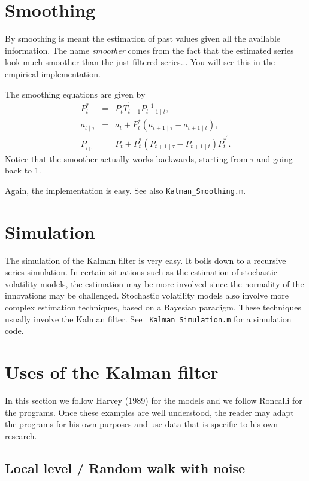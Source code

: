 \documentclass[12pt,a4paper]{article}
\begin{document}
\section{Smoothing}

By smoothing is meant the estimation of past values given all the available
information. The name \textit{smoother} comes from the fact that the
estimated series look much smoother than the just filtered series... You
will see this in the empirical implementation.

The smoothing equations are given by%
\begin{eqnarray*}
P_{t}^{\ast } &=&P_{t}T_{t+1}^{^{\prime }}P_{t+1\mid t}^{-1}, \\
a_{t\mid \tau } &=&a_{t}+P_{t}^{\ast }(a_{t+1\mid \tau }-a_{t+1\mid t}), \\
P_{_{t\mid \tau }} &=&P_{t}+P_{t}^{\ast }(P_{t+1\mid \tau }-P_{t+1\mid
t})P_{t}^{\ast ^{\prime }}.
\end{eqnarray*}%
Notice that the smoother actually works backwards, starting from
$\tau $ and going back to 1.

Again, the implementation is easy. See also \texttt{Kalman\_Smoothing.m}.

\section{Simulation}

The simulation of the Kalman filter is very easy. It boils down to a
recursive series simulation. In certain situations such as the estimation of
stochastic volatility models, the estimation may be more involved since the
normality of the innovations may be challenged. Stochastic volatility models
also involve more complex estimation techniques, based on a Bayesian
paradigm. These techniques usually involve the Kalman filter. See \texttt{%
Kalman\_Simulation.m} for a simulation code.

\section{Uses of the Kalman filter}

In this section we follow Harvey (1989) for the models and we follow
Roncalli for the programs. Once these examples are well understood, the
reader may adapt the programs for his own purposes and use data that is
specific to his own research.

\subsection{Local level / Random walk with noise}
\end{document}
